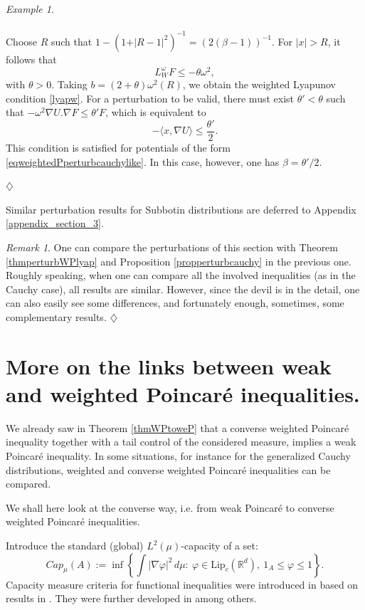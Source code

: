 \documentclass[11pt,reqno]{amsart}
\numberwithin{equation}{section}
\theoremstyle{definition}
\theoremstyle{remark}
\newtheorem{remark}[theorem]{Remark}
\newtheorem{example}[theorem]{Example}
\begin{document}
\begin{example}
\begin{enumerate}
\begin{align*}
    \end{align*}
    Choose $R$ such that $1-(1+\vert R-1\vert^2)^{-1} = (2(\beta-1))^{-1}$. For $|x|>R$, it follows that 
    \begin{equation*}
         L_W^\omega F\leq -\theta\omega^2,
    \end{equation*}
    with $\theta>0$. {Taking $b = (2+\theta)\omega^2(R)$}, we obtain the weighted Lyapunov condition \eqref{lyapw}. For a perturbation to be valid, there must exist $\theta'<\theta$ such that $-\omega^2\nabla U.\nabla F\le \theta' F$, which is equivalent to 
    $$-\langle x, \nabla U\rangle\leq \frac{\theta'}{2}.$$
    This condition is satisfied for potentials of the form \eqref{eqweightedPperturbcauchylike}. In this case, however, one has $\beta = \theta'/2$. 
\end{enumerate}
\hfill $\diamondsuit$
\end{example}
Similar perturbation results for Subbotin distributions are deferred to Appendix \ref{appendix_section_3}.


\begin{remark}\label{remcompare}
One can compare the perturbations of this section with Theorem \ref{thmperturbWPlyap} and Proposition \ref{propperturbcauchy} in the previous one. Roughly speaking, when one can compare all the involved inequalities (as in the Cauchy case), all results are similar. However, since the devil is in the detail, one can also easily see some differences, and fortunately enough, sometimes, some complementary results.
\hfill $\diamondsuit$
\end{remark}


\section{More on the links between weak and weighted Poincar\'e inequalities.} \label{secWPtowP}

We already saw in Theorem \ref{thmWPtoweP} that a converse weighted Poincar\'e inequality together with a tail control of the considered measure, implies a weak Poincar\'e inequality. In some situations, for instance for the generalized Cauchy distributions, weighted and converse weighted Poincar\'e inequalities can be compared. 

We shall here look at the converse way, i.e. from weak Poincar\'e to converse weighted Poincar\'e inequalities.


Introduce the standard (global) $L^2(\mu)$-capacity of a set:
\begin{equation}\label{eq:cap}
  Cap_\mu(A):=\inf\left\{ \int |\nabla \varphi|^2\,d\mu:\ \varphi\in\mathrm{Lip}_c(\mathbb R^d),\ 1_A\le \varphi\le 1\right\}.
\end{equation}
Capacity measure criteria for functional inequalities were introduced in \cite{BRstudia} based on results  in \cite{Masobolev}. They were further developed in \cite{BCR1,BCR2,BCR3,CGG} among others.
\end{document}
